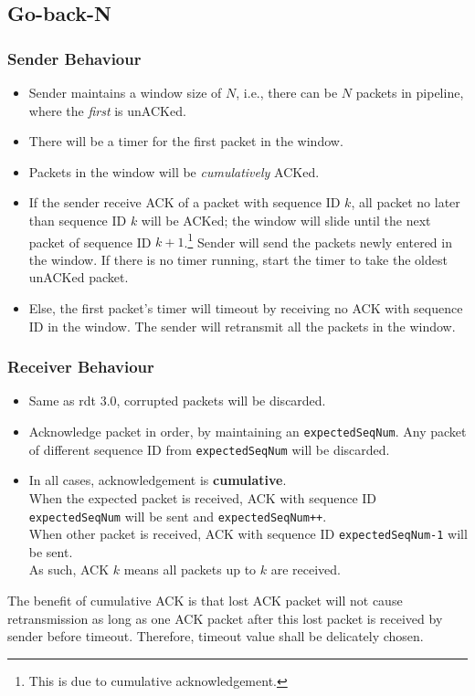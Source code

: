 \documentclass[12pt]{article}
\theoremstyle{definition}
\begin{document}
\subsection{Go-back-N}
\subsubsection{Sender Behaviour}
\begin{itemize}
\item Sender maintains a window size of $N$, i.e., there can be $N$ packets in pipeline, where the \textit{first} is unACKed.
\item There will be a timer for the first packet in the window.
\item Packets in the window will be \textit{cumulatively} ACKed.
\item If the sender receive ACK of a packet with sequence ID $k$, all packet no later than sequence ID $k$ will be ACKed; the window will slide until the next packet of sequence ID $k+1$.\footnote{This is due to cumulative acknowledgement.} Sender will send the packets newly entered in the window. If there is no timer running, start the timer to take the oldest unACKed packet. 
\item Else, the first packet's timer will timeout by receiving no ACK with sequence ID in the window. The sender will retransmit all the packets in the window.
\end{itemize}
\subsubsection{Receiver Behaviour}
\begin{itemize}
  \item Same as rdt 3.0, corrupted packets will be discarded. 
  \item Acknowledge packet in order, by maintaining an \texttt{expectedSeqNum}. Any packet of different sequence ID from \texttt{expectedSeqNum} will be discarded.
  \item In all cases, acknowledgement is \textbf{cumulative}. \\When the expected packet is received, ACK with sequence ID \texttt{expectedSeqNum} will be sent and \texttt{expectedSeqNum++}.\\When other packet is received, ACK with sequence ID \texttt{expectedSeqNum-1} will be sent.\\
  As such, ACK $k$ means all packets up to $k$ are received.
  \end{itemize}
The benefit of cumulative ACK is that lost ACK packet will not cause retransmission as long as one ACK packet after this lost packet is received by sender before timeout. Therefore, timeout value shall be delicately chosen.\\
\end{document}
